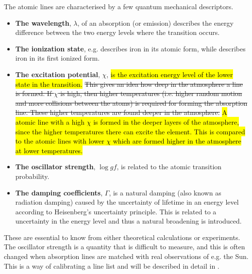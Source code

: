 The atomic lines are characterised by a few quantum mechanical descriptors.
\begin{itemize}
  \item \textbf{The wavelength}, $\lambda$, of an absorption (or emission) describes the energy
        difference between the two energy levels where the transition occurs.
  \item \textbf{The ionization state}, e.g.  describes iron in its atomic form, while
         describes iron in its first ionized form.
  \item \textbf{The excitation potential}, $\chi$, \hl{is the excitation energy level of the lower
        state in the transition.} \st{This gives an idea how deep in the atmosphere a line
        is formed. If $\chi$ is high, then higher temperatures (i.e. higher random motion and more
        collisions between the atoms) is required for forming the absorption line. These higher
        temperatures are found deeper in the atmosphere.} \hl{A atomic line with a high $\chi$ is
        formed in the deeper layers of the atmosphere, since the higher temperatures there can
        excite the element. This is compared to the atomic lines with lower $\chi$ which are formed
        higher in the atmosphere at lower temperatures.}

  \item \textbf{The oscillator strength}, $\log \mathit{gf}$, is related to the atomic transition
        probability.
  \item \textbf{The damping coefficients}, $\Gamma$, is a natural damping (also known as radiation
        damping) caused by the uncertainty of lifetime in an energy level according to Heisenberg's
        uncertainty principle. This is related to a uncertainty in the energy level and thus a
        natural broadening is introduced.
\end{itemize}
These are essential to know from either theoretical calculations or experiments. The oscillator
strength is a quantity that is difficult to measure, and this is often changed when absorption lines
are matched with real observations of e.g. the Sun. This is a way of calibrating a line list and
will be described in detail in .

